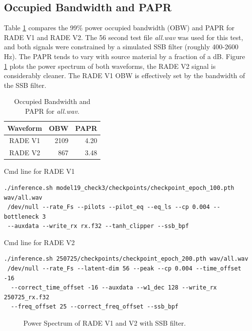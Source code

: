 \documentclass{article}
\begin{document}
\subsection{Occupied Bandwidth and PAPR}

Table \ref{tab:obw_papr} compares the 99\% power occupied bandwidth (OBW) and PAPR for RADE V1 and RADE V2.  The 56 second test file \emph{all.wav} was used for this test, and both signals were constrained by a simulated SSB filter (roughly 400-2600 \si{Hz}). The PAPR tends to vary with source material by a fraction of a \si{dB}.  Figure \ref{fig:radev1v2_psd} plots the power spectrum of both waveforms, the RADE V2 signal is considerably cleaner.  The RADE V1 OBW is effectively set by the bandwidth of the SSB filter.

\begin{table} [h]
\caption{Occupied Bandwidth and PAPR for \emph{all.wav}.}
\label{tab:obw_papr}
\centering
\begin{tabular}{ c |  r | r }
 \hline
 Waveform & OBW & PAPR \\
 \hline
 RADE V1 & 2109 & 4.20  \\
 RADE V2 & 867 & 3.48 \\
 \hline
\end{tabular}
\end{table}

\noindent Cmd line for RADE V1

\begin{verbatim}
./inference.sh model19_check3/checkpoints/checkpoint_epoch_100.pth wav/all.wav
 /dev/null --rate_Fs --pilots --pilot_eq --eq_ls --cp 0.004 --bottleneck 3 
 --auxdata --write_rx rx.f32 --tanh_clipper --ssb_bpf
\end{verbatim}

\noindent Cmd line for RADE V2

\begin{verbatim}
./inference.sh 250725/checkpoints/checkpoint_epoch_200.pth wav/all.wav
 /dev/null --rate_Fs --latent-dim 56 --peak --cp 0.004 --time_offset -16
  --correct_time_offset -16 --auxdata --w1_dec 128 --write_rx 250725_rx.f32
  --freq_offset 25 --correct_freq_offset --ssb_bpf
\end{verbatim}


\begin{figure}[H]
\caption{Power Spectrum of RADE V1 and V2 with SSB filter.}
\label{fig:radev1v2_psd}
\begin{center}


\end{center}
\end{figure}
\end{document}
